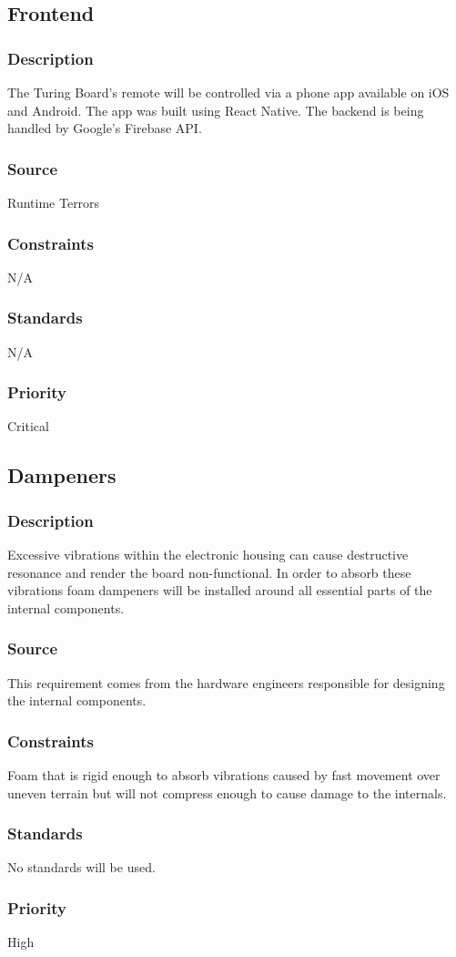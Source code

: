 \subsection{Frontend}
\subsubsection{Description}
The Turing Board's remote will be controlled via a phone app available on iOS and Android. The app was built using React Native. The backend is being handled by Google's Firebase API.
\subsubsection{Source}
Runtime Terrors
\subsubsection{Constraints}
N/A
\subsubsection{Standards}
N/A
\subsubsection{Priority}
Critical

\subsection{Dampeners}
\subsubsection{Description}
Excessive vibrations within the electronic housing can cause destructive resonance and render the board non-functional. In order to absorb these vibrations foam dampeners will be installed around all essential parts of the internal components.
\subsubsection{Source}
This requirement comes from the hardware engineers responsible for designing the internal components.
\subsubsection{Constraints}
Foam that is rigid enough to absorb vibrations caused by fast movement over uneven terrain but will not compress enough to cause damage to the internals.
\subsubsection{Standards}
No standards will be used.
\subsubsection{Priority}
High
